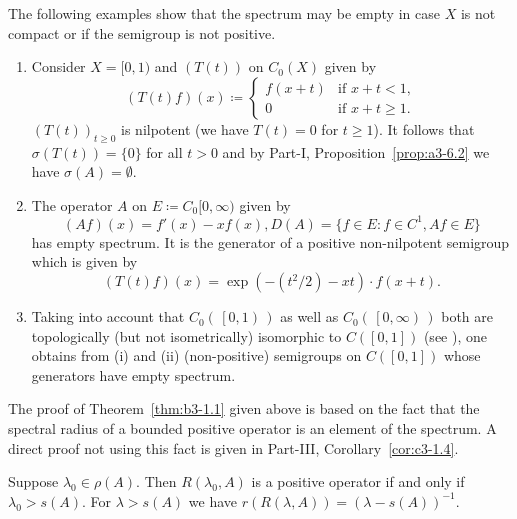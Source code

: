 The following examples show that the spectrum may be empty in case $X$ is not compact or if the semigroup is not positive.
\begin{examples}\label{ex:b3-1.2}
%
\begin{enumerate}[\upshape (i), wide, labelindent=.25em]	
\item  
Consider $X = [0,1)$ and $(T(t))$ on $C_{0}(X)$ given by
%
\begin{equation}\label{eq:b3-1.7}
	(T(t)f)(x) \coloneq \begin{cases} 
		f(x+t) & \text{if } x+t < 1 ,  \\
		0 & \text{if } x+t \geq 1.
	\end{cases}
\end{equation}
$(T(t))_{t\geq 0}$ is nilpotent (we have $T(t) = 0$ for $t \geq 1$).
It follows that $\sigma(T(t)) = \{0\}$ for all $t > 0$ and by Part-I, Proposition~\ref{prop:a3-6.2} we have $\sigma(A) = \emptyset$.

\item 
The operator $A$ on $E \coloneq C_{0}[0,\infty)$ given by
\begin{equation}\label{eq:b3-1.8}
	(Af)(x) = f'(x) - xf(x), D(A) = \{f \in E \colon f \in C^1, Af \in E\}
\end{equation}
has empty spectrum.
It is the generator of a positive non-nilpotent semigroup which is given by
\begin{equation}\label{eq:b3-1.9}
	(T(t)f)(x) = \exp(-(t^2/2) - xt) \cdot f(x+t).
\end{equation}
	
\item 
Taking into account that $C_{0}( \, \left[ 0 , 1\right) \, )$ as well as 
$C_{0}( \, \left[ 0 , \infty \right) \, )$ both are topologically (but not isometrically) isomorphic to $C(\left[0,1\right])$ (see \textcite[Section~21.5]{semadeni:1971}), one obtains from (i) and (ii) (non-positive) semigroups on $C(\left[0,1\right])$ whose generators have empty spectrum.
\end{enumerate}
\end{examples}
The proof of Theorem~\ref{thm:b3-1.1} given above is based on the fact that the spectral radius of a bounded positive operator is an element of the spectrum.
A direct proof not using this fact is given in Part-III, Corollary~\ref{cor:c3-1.4}.
\begin{corollary}\label{cor:b3-1.3}
	Suppose $\lambda_0 \in \rho(A)$.
	Then $R(\lambda_0,A)$ is a positive operator if and only if\/ $\lambda_0 > s(A)$.
	For $\lambda > s(A)$ we have $r(R(\lambda,A)) = (\lambda - s(A))^{-1}$.
\end{corollary}

